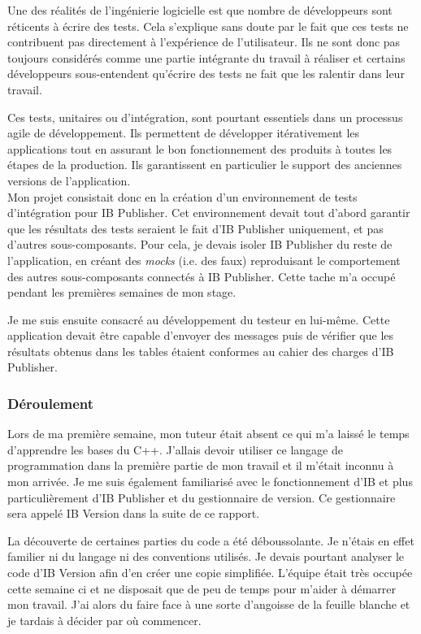 \documentclass[11pt, oneside, titlepage, a4paper]{article}
\begin{document}
Une des réalités de l'ingénierie logicielle est que nombre de développeurs sont réticents à écrire des tests. Cela s'explique sans doute par le fait que ces tests ne contribuent pas directement à l'expérience de l'utilisateur. Ils ne sont donc pas toujours considérés comme une partie intégrante du travail à réaliser et certains développeurs sous-entendent qu'écrire des tests ne fait que les ralentir dans leur travail.

Ces tests, unitaires ou d'intégration, sont pourtant essentiels dans un processus agile de développement. Ils permettent de développer itérativement les applications tout en assurant le bon fonctionnement des produits à toutes les étapes de la production. Ils garantissent en particulier le support des anciennes versions de l'application.
\\

Mon projet consistait donc en la création d'un environnement de tests d'intégration pour IB Publisher. Cet environnement devait tout d'abord garantir que les résultats des tests seraient le fait d'IB Publisher uniquement, et pas d'autres sous-composants. Pour cela, je devais isoler IB Publisher du reste de l'application, en créant des \textit{mocks} (i.e. des faux) reproduisant le comportement des autres sous-composants connectés à IB Publisher. Cette tache m'a occupé pendant les premières semaines de mon stage.

Je me suis ensuite consacré au développement du testeur en lui-même. Cette application devait être capable d'envoyer des messages puis de vérifier que les résultats obtenus dans les tables étaient conformes au cahier des charges d'IB Publisher.
		\subsubsection{Déroulement}
Lors de ma première semaine, mon tuteur était absent ce qui m'a laissé le temps d'apprendre les bases du C++. J'allais devoir utiliser ce langage de programmation dans la première partie de mon travail et il m'était inconnu à mon arrivée. Je me suis également familiarisé avec le fonctionnement d'IB et plus particulièrement d'IB Publisher et du gestionnaire de version. Ce gestionnaire sera appelé IB Version dans la suite de ce rapport.

La découverte de certaines parties du code a été déboussolante. Je n'étais en effet familier ni du langage ni des conventions utilisés. Je devais pourtant analyser le code d'IB Version afin d'en créer une copie simplifiée. L'équipe était très occupée cette semaine ci et ne disposait que de peu de temps pour m'aider à démarrer mon travail. J'ai alors du faire face à une sorte d'angoisse de la feuille blanche et je tardais à décider par où commencer.
\\
\end{document}
